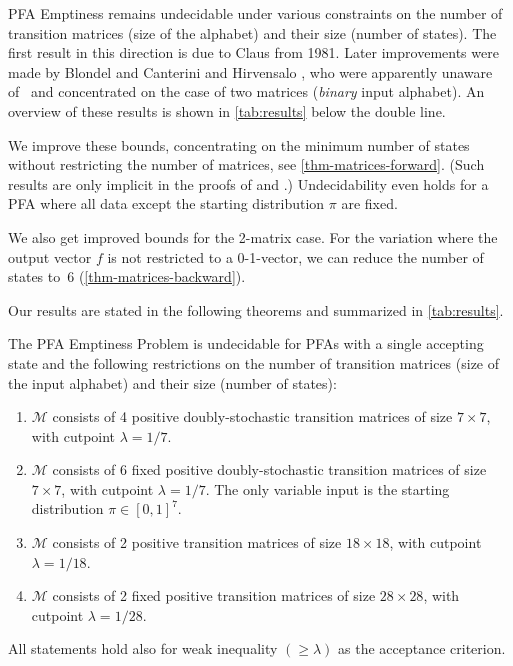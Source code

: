 \documentclass[a4paper,cleveref, autoref, thm-restate]{lipics-v2021}
\begin{document}

PFA Emptiness remains undecidable under various constraints on the
number of transition matrices (size of the alphabet) and their
size (number of states).
The first result in this direction is due to
 Claus
 \cite{claus81} from 1981. Later improvements were made
 by
  Blondel and Canterini
  \cite{blondel-canterini-03} and Hirvensalo
  \cite{hirvensalo07}, who were apparently unaware of~\cite{claus81}
and concentrated on the case of
  two matrices (\emph{binary} input alphabet).
An overview of these results is shown in \autoref{tab:results} below the double line.
  
We improve these bounds, concentrating on 
 the minimum number of states without restricting the
 number of matrices,
see \autoref{thm-matrices-forward}.
(Such results are only implicit in the proofs of \cite{blondel-canterini-03} and
\cite{hirvensalo07}.)
Undecidability even holds for a PFA where all data except the
starting distribution $\pi$ are fixed.

We also get improved bounds for the 2-matrix case.
%
For the variation where the output vector $f$ is not
restricted to a 0-1-vector, we can reduce the number of
states to~6
(\autoref{thm-matrices-backward}).

Our results are stated in
the following theorems and summarized in
\autoref{tab:results}.


\begin{theorem}
  \label{thm-matrices-forward}
The PFA Emptiness Problem %
 is undecidable for PFAs with a
 single accepting state and the following restrictions on the number
 of transition matrices (size of the input alphabet)
 and their size (number of states):
  \begin{enumerate}[\rm(a)]
  \item \label{4-positive}
    $\mathcal{M}$ consists of
    4 %
    positive doubly-stochastic transition matrices of size $7\times 7$, with
    cutpoint $\lambda=1/7$.
  \item \label{5-fixed}
    $\mathcal{M}$ consists of
    6 %
    fixed positive doubly-stochastic transition matrices of size $7\times 7$, with
    cutpoint $\lambda=1/7$.
    The only variable input is the starting distribution $\pi\in [0,1]^7$.
  \item  \label{2-matrices}
    $\mathcal{M}$ consists of
    2 %
    positive transition matrices of size $18\times 18$, with cutpoint
    $\lambda=1/18$.
  \item  \label{2-matrices-fixed}
    $\mathcal{M}$ consists of
    2 %
    fixed
    positive transition matrices of size $28\times 28$, with cutpoint
    $\lambda=1/28$.
\end{enumerate}   
All statements hold also for weak inequality $(\ge\lambda)$ as the  acceptance criterion.
\end{theorem}
\end{document}
